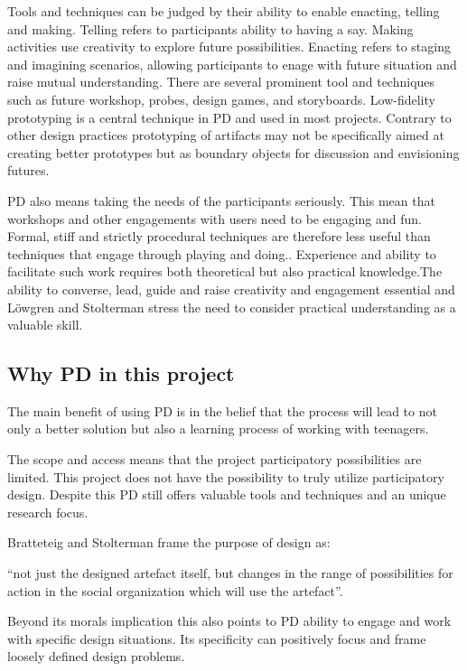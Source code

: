 \documentclass[11pt,UKenglish, a4paper]{article}
\begin{document}
Tools and techniques can be judged by their ability to enable enacting, telling and making. Telling refers to participants ability to having a say. Making activities use creativity to explore future possibilities. Enacting refers to staging and imagining scenarios, allowing participants to enage with future situation and raise mutual understanding\cite[p.149]{Simonsen2012Routledge}. There are several prominent tool and techniques such as future workshop, probes, design games, and storyboards.
Low-fidelity prototyping is a central technique in PD and used in most projects. Contrary to other design practices prototyping of artifacts may not be specifically aimed at creating better prototypes but as boundary objects for discussion and envisioning futures.

PD also means taking the needs of the participants seriously. This mean that workshops and other engagements with users need to be engaging and fun. Formal, stiff and strictly procedural techniques are therefore less useful than techniques that engage through playing and doing.\cite[p.153]{Loewgren2004Thoughtful}. Experience and ability to facilitate such work requires both theoretical but also practical knowledge.The ability to converse, lead, guide and raise creativity and engagement essential and Löwgren and Stolterman stress the need to consider practical understanding as a valuable skill\cite[p.152]{Loewgren2004Thoughtful}. 

\subsection{Why PD in this project}
The main benefit of using PD is in the belief that the process will lead to not only a better solution but also a learning process of working with teenagers.

The scope and access means that the project participatory possibilities are limited. This project does not have the possibility to truly utilize participatory design. Despite this PD still offers valuable tools and techniques and an unique research focus. 


Bratteteig and Stolterman frame the purpose of design as:

``not just the designed artefact itself, but changes in the range of possibilities for action in the social organization which will use the artefact''\cite[p.~4]{Bratteteig1997Design}.

Beyond its morals implication this also points to PD ability to engage and work with specific design situations. Its specificity can positively focus and frame loosely defined design problems.  
\end{document}
